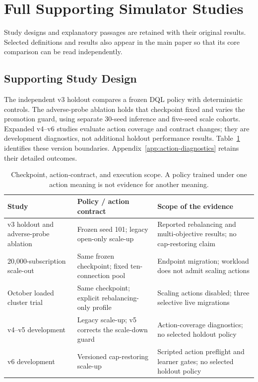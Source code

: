 \section{Full Supporting Simulator Studies}
\label{app:holdout-details}
Study designs and explanatory passages are retained with their original
results. Selected definitions and results also appear in the main paper so
that its core comparison can be read independently.
\subsection{Supporting Study Design}

The independent v3 holdout compares a frozen DQL policy with deterministic
controls. The adverse-probe ablation holds that checkpoint fixed and varies
the promotion guard, using separate 30-seed inference and five-seed scale
cohorts. Expanded v4--v6 studies evaluate action coverage and contract changes;
they are development diagnostics, not additional holdout performance results.
Table~\ref{tab:action-contract-map} identifies these version boundaries.
Appendix~\ref{app:action-diagnostics} retains their detailed outcomes.

\begin{table}[!htbp]
\centering\small
\caption{Checkpoint, action-contract, and execution scope. A policy trained
under one action meaning is not evidence for another meaning.}
\label{tab:action-contract-map}
\begin{tabular}{p{}p{}p{}}
\toprule
Study & Policy / action contract & Scope of the evidence\\
\midrule
v3 holdout and adverse-probe ablation & Frozen seed 101; legacy open-only scale-up & Reported rebalancing and multi-objective results; no cap-restoring claim\\
20,000-subscription scale-out & Same frozen checkpoint; fixed ten-connection pool & Endpoint migration; workload does not admit scaling actions\\
October loaded cluster trial & Same checkpoint; explicit rebalancing-only profile & Scaling actions disabled; three selective live migrations\\
v4--v5 development & Legacy scale-up; v5 corrects the scale-down guard & Action-coverage diagnostics; no selected holdout policy\\
v6 development & Versioned cap-restoring scale-up & Scripted action preflight and learner gates; no selected holdout policy\\
\bottomrule
\end{tabular}
\end{table}

